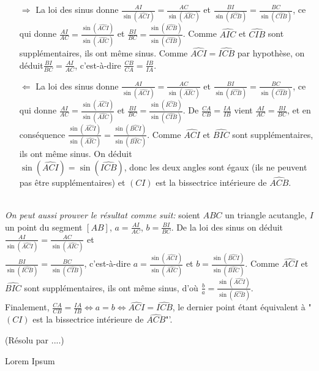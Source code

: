 \begin{sol}[13]
		\begin{itemize}
				\item[$\Rightarrow$] La loi des sinus donne $\frac{AI}{\sin(\widehat{ACI})}=\frac{AC}{\sin(\widehat{AIC})}$ et $\frac{BI}{\sin(\widehat{ICB})}=\frac{BC}{\sin(\widehat{CIB})}$, ce qui donne $\frac{AI}{AC}=\frac{\sin(\widehat{ACI})}{\sin(\widehat{AIC})}$ et $\frac{BI}{BC}=\frac{\sin(\widehat{ICB})}{\sin(\widehat{CIB})}$. Comme $\widehat{AIC}$ et $\widehat{CIB}$ sont suppl\'ementaires, ils ont m\^eme sinus. Comme $\widehat{ACI}=\widehat{ICB}$ par hypoth\`ese, on d\'eduit$\frac{BI}{BC}=\frac{AI}{AC}$, c'est-\`a-dire $\frac{CB}{CA}=\frac{IB}{IA}$. \\
				\item[$\Leftarrow$] La loi des sinus donne $\frac{AI}{\sin(\widehat{ACI})}=\frac{AC}{\sin(\widehat{AIC})}$ et $\frac{BI}{\sin(\widehat{ICB})}=\frac{BC}{\sin(\widehat{CIB})}$, ce qui donne $\frac{AI}{AC}=\frac{\sin(\widehat{ACI})}{\sin(\widehat{AIC})}$ et $\frac{BI}{BC}=\frac{\sin(\widehat{ICB})}{\sin(\widehat{CIB})}$. De $\frac{CA}{CB} = \frac{IA}{IB}$ vient $\frac{AI}{AC}=\frac{BI}{BC}$, et en cons\'equence $\frac{\sin(\widehat{ACI})}{\sin(\widehat{AIC})}=\frac{\sin(\widehat{BCI})}{\sin(\widehat{BIC})}$. Comme $\widehat{ACI}$ et $\widehat{BIC}$ sont suppl\'ementaires, ils ont m\^eme sinus.
				On d\'eduit \\ $\sin(\widehat{ACI})=\sin(\widehat{ICB})$, donc les deux angles sont \'egaux (ils ne peuvent pas \^etre suppl\'ementaires) et $(CI)$ est la bissectrice int\'erieure de $\widehat{ACB}$. 
		\end{itemize}~\\
		\textit{On peut aussi prouver le r\'esultat comme suit:} soient $ABC$ un triangle acutangle, $I$ un point du segment $[AB]$, $a = \frac{AI}{AC}$, $b = \frac{BI}{BC}$. De la loi des sinus on d\'eduit $\frac{AI}{\sin(\widehat{ACI})}=\frac{AC}{\sin(\widehat{AIC})}$ et \\ $\frac{BI}{\sin(\widehat{ICB})}=\frac{BC}{\sin(\widehat{CIB})}$, c'est-\`a-dire $a = \frac{\sin(\widehat{ACI})}{\sin(\widehat{AIC})}$ et $b=\frac{\sin(\widehat{BCI})}{\sin(\widehat{BIC})}$. Comme $\widehat{ACI}$ et $\widehat{BIC}$ sont suppl\'ementaires, ils ont m\^eme sinus, d'o\`u $\frac{b}{a}=\frac{\sin(\widehat{ACI})}{\sin(\widehat{ICB})}$. \\
		Finalement, $\frac{CA}{CB}=\frac{IA}{IB} \Leftrightarrow a = b \Leftrightarrow \widehat{ACI}=\widehat{ICB}$, le dernier point \'etant \'equivalent \`a "$(CI)$ est la bissectrice int\'erieure de $\widehat{ACB}$"'.
\end{sol}

\begin{sol}[1](Résolu par ....)

Lorem Ipsum

\end{sol}
